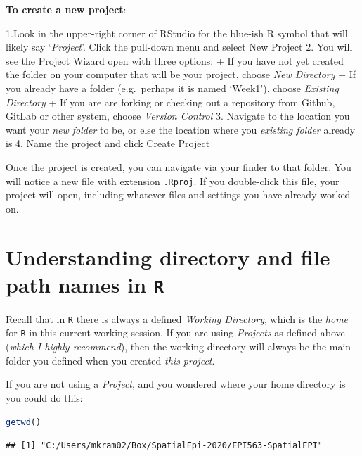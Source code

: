 \documentclass[
]{book}
\newcommand{\passthrough}[1]{#1}
\begin{document}
\textbf{To create a new project}:

1.Look in the upper-right corner of RStudio for the blue-ish R symbol that will likely say `\emph{Project}'. Click the pull-down menu and select New Project
2. You will see the Project Wizard open with three options:
+ If you have not yet created the folder on your computer that will be your project, choose \emph{New Directory}
+ If you already have a folder (e.g.~perhaps it is named `Week1'), choose \emph{Existing Directory}
+ If you are are forking or checking out a repository from Github, GitLab or other system, choose \emph{Version Control}
3. Navigate to the location you want your \emph{new folder} to be, or else the location where you \emph{existing folder} already is
4. Name the project and click Create Project

Once the project is created, you can navigate via your finder to that folder. You will notice a new file with extension \passthrough{\lstinline!.Rproj!}. If you double-click this file, your project will open, including whatever files and settings you have already worked on.

\hypertarget{understanding-directory-and-file-path-names-in-r}{%
\section*{\texorpdfstring{Understanding directory and file path names in \texttt{R}}{Understanding directory and file path names in R}}\label{understanding-directory-and-file-path-names-in-r}}

Recall that in \passthrough{\lstinline!R!} there is always a defined \emph{Working Directory}, which is the \emph{home} for \passthrough{\lstinline!R!} in this current working session. If you are using \emph{Projects} as defined above (\emph{which I highly recommend}), then the working directory will always be the main folder you defined when you created \emph{this project}.

If you are not using a \emph{Project}, and you wondered where your home directory is you could do this:

\begin{lstlisting}[language=R]
getwd()
\end{lstlisting}

\begin{lstlisting}
## [1] "C:/Users/mkram02/Box/SpatialEpi-2020/EPI563-SpatialEPI"
\end{lstlisting}
\end{document}
